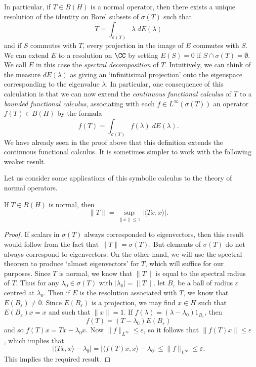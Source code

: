 In particular, if $T \in B(H)$ is a normal operator, then there exists a unique resolution of the identity on Borel subsets of $\sigma(T)$ such that
%
\[ T = \int_{\sigma(T)} \lambda\; dE(\lambda) \]
%
and if $S$ commutes with $T$, every projection in the image of $E$ commutes with $S$. We can extend $E$ to a resolution on $\CC$ by setting $E(S) = 0$ if $S \cap \sigma(T) = \emptyset$. We call $E$ in this case the \emph{spectral decomposition} of $T$. Intuitively, we can think of the measure $dE(\lambda)$ as giving an `infinitisimal projection' onto the eigenspace corresponding to the eigenvalue $\lambda$. In particular, one consequence of this calculation is that we can now extend the \emph{continuous functional calculus} of $T$ to a \emph{bounded functional calculus}, associating with each $f \in L^\infty(\sigma(T))$ an operator $f(T) \in B(H)$ by the formula
%
\[ f(T) = \int_{\sigma(T)} f(\lambda)\; dE(\lambda). \]
%
We have already seen in the proof above that this definition extends the continuous functional calculus. It is sometimes simpler to work with the following weaker result.

Let us consider some applications of this symbolic calculus to the theory of normal operators.

\begin{theorem}
    If $T \in B(H)$ is normal, then
    \[ \| T \| = \sup_{\|x\| \leq 1} |\langle Tx, x \rangle|. \]
\end{theorem}
\begin{proof}
    If scalars in $\sigma(T)$ always corresponded to eigenvectors, then this result would follow from the fact that $\| T \| = \sigma(T)$. But elements of $\sigma(T)$ do not always correspond to eigenvectors. On the other hand, we will use the spectral theorem to produce `almost eigenvectors' for $T$, which will suffice for our purposes. Since $T$ is normal, we know that $\| T \|$ is equal to the spectral radius of $T$. Thus for any $\lambda_0 \in \sigma(T)$ with $|\lambda_0| = \| T \|$. let $B_\varepsilon$ be a ball of radius $\varepsilon$ centred at $\lambda_0$. Then if $E$ is the resolution associated with $T$, we know that $E(B_\varepsilon) \neq 0$. Since $E(B_\varepsilon)$ is a projection, we may find $x \in H$ such that $E(B_\varepsilon) x = x$ and such that $\| x \| = 1$. If $f(\lambda) = (\lambda - \lambda_0) 1_{B_\varepsilon}$, then
    \[ f(T) = (T - \lambda_0) E(B_\varepsilon) \]
    and so $f(T) x = Tx - \lambda_0 x$. Now $\| f \|_{L^\infty} \leq \varepsilon$, so it follows that $\| f(T) x \| \leq \varepsilon$, which implies that
    \[ |\langle Tx, x \rangle - \lambda_0| = |\langle f(T)x, x \rangle - \lambda_0| \leq \| f \|_{L^\infty} \leq \varepsilon. \]
    This implies the required result.
\end{proof}

